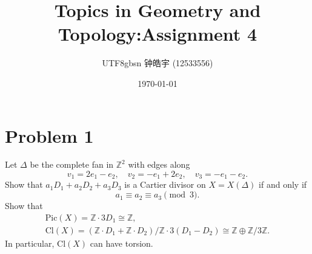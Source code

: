 \documentclass[12pt, a4paper]{article}
\title{Topics in Geometry and Topology:Assignment 4}
\author{
    \begin{CJK*}{UTF8}{gbsn}
    钟皓宇 (12533556)
    \end{CJK*}
}
\date{\today}
\begin{document}
\maketitle
\section*{Problem 1}
Let $\Delta$ be the complete fan in $\mathbb{Z}^2$ with edges along
\[ v_1 = 2e_1 - e_2, \quad v_2 = -e_1 + 2e_2, \quad v_3 = -e_1 - e_2. \]
Show that $a_1D_1 + a_2D_2 + a_3D_3$ is a Cartier divisor on $X = X(\Delta)$ if and only if
\[ a_1 \equiv a_2 \equiv a_3 \pmod 3. \]
Show that
\begin{gather*}
\text{Pic}(X) = \mathbb{Z} \cdot 3D_1 \cong \mathbb{Z}, \\
\text{Cl}(X) = (\mathbb{Z} \cdot D_1 + \mathbb{Z} \cdot D_2)/\mathbb{Z} \cdot 3(D_1 - D_2) \cong \mathbb{Z} \oplus \mathbb{Z}/3\mathbb{Z}.
\end{gather*}
In particular, $\text{Cl}(X)$ can have torsion.
\end{document}
